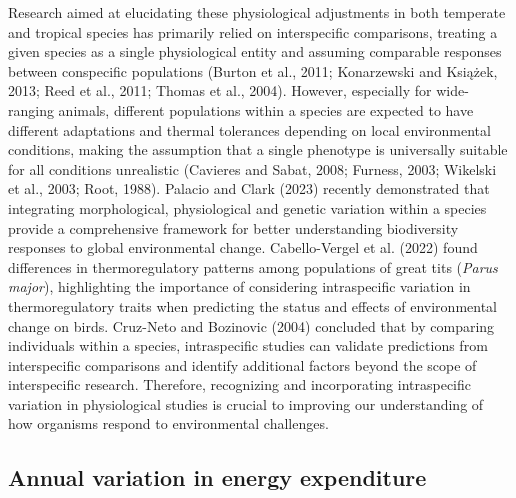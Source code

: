 \documentclass[10pt, twoside]{book} %
\begin{document}
Research aimed at elucidating these physiological adjustments in both temperate and tropical species has primarily relied on interspecific comparisons, treating a given species as a single physiological entity and assuming comparable responses between conspecific populations (Burton et al., 2011; Konarzewski and Książek, 2013; Reed et al., 2011; Thomas et al., 2004). However, especially for wide-ranging animals, different populations within a species are expected to have different adaptations and thermal tolerances depending on local environmental conditions, making the assumption that a single phenotype is universally suitable for all conditions unrealistic (Cavieres and Sabat, 2008; Furness, 2003; Wikelski et al., 2003; Root, 1988). Palacio and Clark (2023) recently demonstrated that integrating morphological, physiological and genetic variation within a species provide a comprehensive framework for better understanding biodiversity responses to global environmental change. Cabello-Vergel et al. (2022) found differences in thermoregulatory patterns among populations of great tits (\textit{Parus major}), highlighting the importance of considering intraspecific variation in thermoregulatory traits when predicting the status and effects of environmental change on birds. Cruz-Neto and Bozinovic (2004) concluded that by comparing individuals within a species, intraspecific studies can validate predictions from interspecific comparisons and identify additional factors beyond the scope of interspecific research. Therefore, recognizing and incorporating intraspecific variation in physiological studies is crucial to improving our understanding of how organisms respond to environmental challenges.\\

\subsection{Annual variation in energy expenditure}
\end{document}
